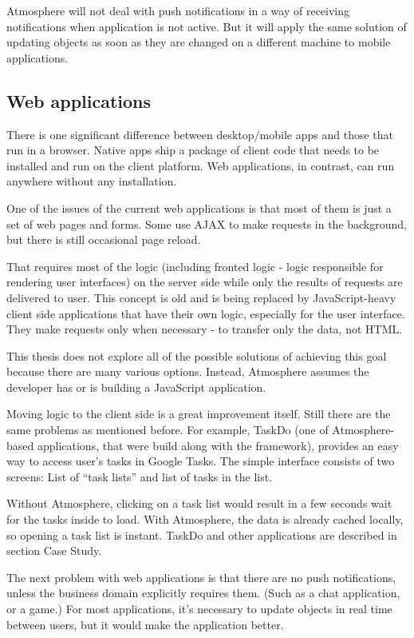 Atmosphere will not deal with push notifications in a way of receiving notifications when application is not active. But it will apply the same solution of updating objects as soon as they are changed on a different machine to mobile applications. 

\subsection{Web applications}

There is one significant difference between desktop/mobile apps and those that run in a browser. Native apps ship a package of client code that needs to be installed and run on the client platform. Web applications, in contrast, can run anywhere without any installation.

One of the issues of the current web applications is that most of them is just a set of web pages and forms. Some use AJAX to make requests in the background, but there is still occasional page reload.

That requires most of the logic (including fronted logic - logic responsible for rendering user interfaces) on the server side while only the results of requests are delivered to user. This concept is old \citep{html_history} and is being replaced by JavaScript-heavy client side applications that have their own logic, especially for the user interface. They make requests only when necessary - to transfer only the data, not HTML.

This thesis does not explore all of the possible solutions of achieving this goal because there are many various options. Instead, Atmosphere assumes the developer has or is building a JavaScript application.

Moving logic to the client side is a great improvement itself. Still there are the same problems as mentioned before. For example, TaskDo (one of Atmosphere-based applications, that were build along with the framework), provides an easy way to access user's tasks in Google Tasks. The simple interface consists of two screens: List of ``task lists'' and list of tasks in the list.

Without Atmosphere, clicking on a task list would result in a few seconds wait for the tasks inside to load. With Atmosphere, the data is already cached locally, so opening a task list is instant. TaskDo and other applications are described in section Case Study.

The next problem with web applications is that there are no push notifications, unless the business domain explicitly requires them. (Such as a chat application, or a game.) For most applications, it's necessary to update objects  in real time between users, but it would make the application better.